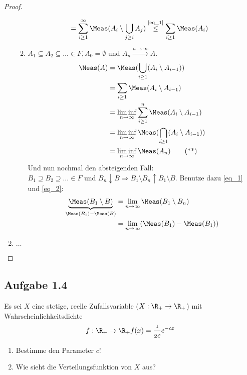 \begin{proof}
\begin{enumerate}
\begin{enumerate}
\begin{align}
			&= \sum_{i\ge 1}^{\infty} \Meas(A_i \setminus \bigcup_{j \ge i} A_j) \overset{\text{\cref{eq_1}}}{\le} \sum_{i\ge 1} \Meas(A_i)\notag
			\end{align}
			\item $A_1 \subseteq A_2 \subseteq \dots \in F, A_0 = \emptyset$ und $A_n \xrightarrow{n \to \infty} A$. 
			\begin{align}
				\Meas(A) 
				&= \Meas(\bigcup_{i \ge 1} (A_i \setminus A_{i-1})) \notag\\
				&= \sum_{i\ge 1} \Meas(A_i \setminus A_{i-1})\notag\\
				&= \liminf_{n \to \infty} \sum_{i\ge 1}^{n} \Meas(A_i \setminus A_{i-1})\notag \\
				&= \liminf_{n \to \infty} \Meas(\bigcap_{i \ge 1} (A_i\setminus A_{i-1})) \notag\\
				&= \liminf_{n \to \infty} \Meas(A_n)
				\label{eq_2}\tag{**}
			\end{align}
			Und nun nochmal den absteigenden Fall:\\
			$B_1 \supseteq B_2 \supseteq \dots \in F$ und $B_n \downarrow B \Longrightarrow B_1 \setminus B_n \uparrow B_1 \setminus B$. Benutze dazu \cref{eq_1} und \cref{eq_2}:
			\begin{align}
				\underbrace{\Meas(B_1 \setminus B)}_{\Meas(B_1) - \Meas(B)} &= \lim_{n \to \infty} \Meas(B_1 \setminus B_n) \notag\\
				&= \lim_{n \to \infty} (\Meas(B_1) - \Meas(B_1))\notag
			\end{align}
		\end{enumerate}
	\item $\dots$ %
	\end{enumerate}
\end{proof}


\subsection{Aufgabe 1.4}
Es sei $X$ eine stetige, reelle Zufallsvariable ($X: \R_{+} \to \R_{+}$) mit Wahrscheinlichkeitsdichte
\begin{align*}
	f: \R_{+} \to \R_{+} \mit f(x) = \frac{1}{2c} e^{-cx}
\end{align*}

\begin{enumerate}[label=\alph*)]
	\item Bestimme den Parameter $c$!
	\item Wie sieht die Verteilungsfunktion von $X$ aus?
\end{enumerate}

